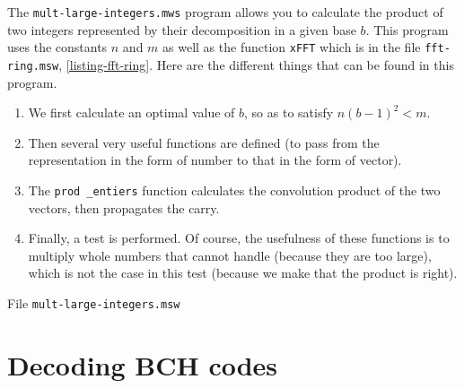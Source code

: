  
 The \Maple{} \texttt{mult-large-integers.mws} program allows you to calculate the product of two integers represented by their decomposition in a given base $ b $. This program uses the constants $ n $ and $ m $ as well as the function \texttt{xFFT} which is in the file \texttt{fft-ring.msw}, \ref{listing-fft-ring}. Here are the different things that can be found in this program. \begin{enumerate}
\item We first calculate an optimal value of $ b $, so as to satisfy $ n (b-1)^2 <m $.
\item Then several very useful functions are defined (to pass from the representation in the form of number to that in the form of vector).
\item The \texttt{prod \_entiers} function calculates the convolution product of the two vectors, then propagates the carry.
\item Finally, a test is performed. Of course, the usefulness of these functions is to multiply whole numbers that \Maple{} cannot handle (because they are too large), which is not the case in this test (because we make  that the product is right).
\end{enumerate}
 
 
 
\begin{listing} \begin{footnotesize}

\end{footnotesize}
 
\caption{File \texttt{mult-large-integers.msw}}
 
\label{listing-mult-large-integers}
\end{listing}
 
\section{Decoding BCH codes}
\label{sect1-listing-decoding-bch}
 
